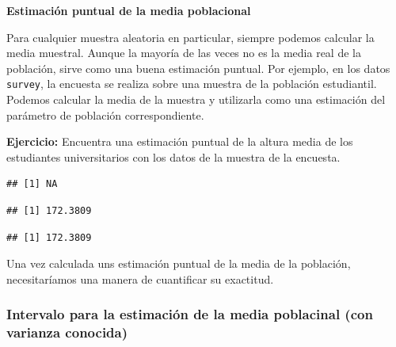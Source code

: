 \documentclass[]{article}
\newenvironment{Shaded}{\begin{snugshade}}{\end{snugshade}}
\newcommand{\KeywordTok}[1]{\textcolor[rgb]{0.13,0.29,0.53}{\textbf{{#1}}}}
\newcommand{\DataTypeTok}[1]{\textcolor[rgb]{0.13,0.29,0.53}{{#1}}}
\newcommand{\CommentTok}[1]{\textcolor[rgb]{0.56,0.35,0.01}{\textit{{#1}}}}
\newcommand{\OtherTok}[1]{\textcolor[rgb]{0.56,0.35,0.01}{{#1}}}
\newcommand{\NormalTok}[1]{{#1}}
\numberwithin{equation}{section}
\begin{document}
\textbf{Estimación puntual de la media poblacional}

Para cualquier muestra aleatoria en particular, siempre podemos calcular
la media muestral. Aunque la mayoría de las veces no es la media real de
la población, sirve como una buena estimación puntual. Por ejemplo, en
los datos \texttt{survey}, la encuesta se realiza sobre una muestra de
la población estudiantil. Podemos calcular la media de la muestra y
utilizarla como una estimación del parámetro de población
correspondiente.

\textbf{Ejercicio:} Encuentra una estimación puntual de la altura media
de los estudiantes universitarios con los datos de la muestra de la
encuesta.

\begin{Shaded}
\end{Shaded}

\begin{verbatim}
## [1] NA
\end{verbatim}

\begin{Shaded}
\end{Shaded}

\begin{verbatim}
## [1] 172.3809
\end{verbatim}

\begin{Shaded}
\end{Shaded}

\begin{verbatim}
## [1] 172.3809
\end{verbatim}

Una vez calculada uns estimación puntual de la media de la población,
necesitaríamos una manera de cuantificar su exactitud.

\subsubsection{Intervalo para la estimación de la media poblacinal (con
varianza
conocida)}\label{intervalo-para-la-estimacion-de-la-media-poblacinal-con-varianza-conocida}
\end{document}

